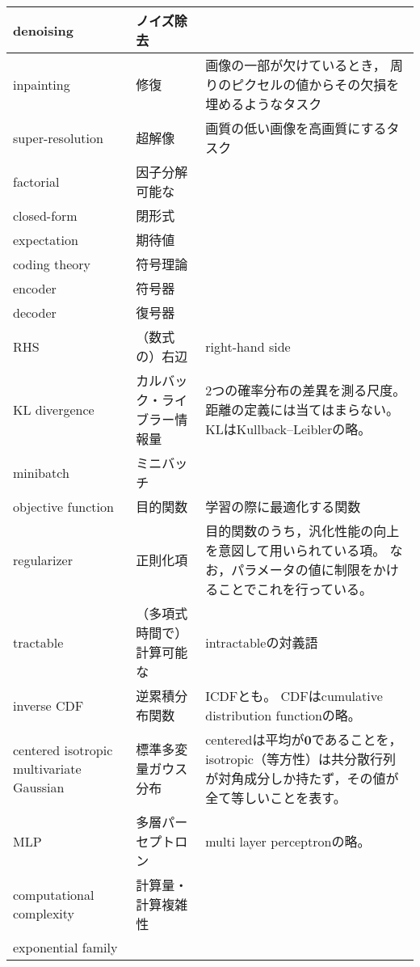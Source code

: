 \documentclass[dvipdfmx, fleqn]{jsarticle}
\begin{document}
\begin{longtable}{p{4cm}p{4cm}p{7cm}}
        denoising
            & ノイズ除去
            & 
            \tabularnewline \hline
        inpainting
            & 修復
            & 画像の一部が欠けているとき，
            周りのピクセルの値からその欠損を埋めるようなタスク
            \tabularnewline \hline
        super-resolution
            & 超解像
            & 画質の低い画像を高画質にするタスク
            \tabularnewline \hline
        factorial
            & 因子分解可能な
            & 
            \tabularnewline \hline
        closed-form
            & 閉形式
            & 
            \tabularnewline \hline
        expectation
            & 期待値
            & 
            \tabularnewline \hline
        coding theory
            & 符号理論
            & 
            \tabularnewline \hline
        encoder
            & 符号器
            & 
            \tabularnewline \hline
        decoder
            & 復号器
            & 
            \tabularnewline \hline
        RHS
            & （数式の）右辺
            & right-hand side
            \tabularnewline \hline
        KL divergence
            & カルバック・ライブラー情報量
            & 2つの確率分布の差異を測る尺度。
            距離の定義には当てはまらない。
            KLはKullback–Leiblerの略。
            \tabularnewline \hline
        minibatch
            & ミニバッチ
            & 
            \tabularnewline \hline
        objective function
            & 目的関数
            & 学習の際に最適化する関数
            \tabularnewline \hline
        regularizer
            & 正則化項
            & 目的関数のうち，汎化性能の向上を意図して用いられている項。
            なお，パラメータの値に制限をかけることでこれを行っている。
            \tabularnewline \hline
        tractable
            & （多項式時間で）計算可能な
            & intractableの対義語
            \tabularnewline \hline
        inverse CDF
            & 逆累積分布関数
            & ICDFとも。
            CDFはcumulative distribution functionの略。
            \tabularnewline \hline
        centered isotropic multivariate Gaussian
            & 標準多変量ガウス分布
            & centeredは平均が\(\bm{0}\)であることを，isotropic（等方性）は共分散行列が対角成分しか持たず，その値が全て等しいことを表す。
            \tabularnewline \hline
        MLP
            & 多層パーセプトロン
            & multi layer perceptronの略。
            \tabularnewline \hline
        computational complexity
            & 計算量・計算複雑性
            & 
            \tabularnewline \hline
        exponential family
            & 
            & 
            \tabularnewline \hline

\end{longtable}
\end{document}
